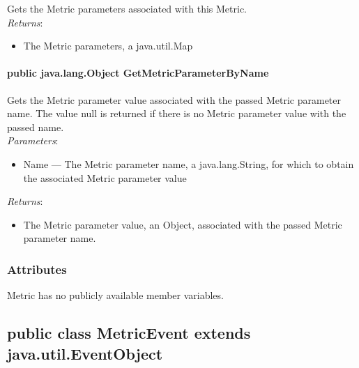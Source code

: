 \documentclass[$Date: 2003/06/26 19:29:31 $]{glabarticle}
\begin{document}
Gets the Metric parameters associated with this Metric. \\

\textit{Returns}:
\begin{itemize}
\item[] The Metric parameters, a java.util.Map
\end{itemize}

\paragraph{public java.lang.Object GetMetricParameterByName}

Gets the Metric parameter value associated with the passed Metric parameter name. The value null is returned 
if there is no Metric parameter value with the passed name. \\

\textit{Parameters}:
\begin{itemize}
\item[] Name --- The Metric parameter name, a java.lang.String, for which to obtain the associated Metric 
parameter value
\end{itemize}

\textit{Returns}:
\begin{itemize}
\item[] The Metric parameter value, an Object, associated with the passed Metric parameter name.
\end{itemize}


\subsubsection{Attributes}

Metric has no publicly available member variables. 


\newpage

\subsection{public class MetricEvent extends java.util.EventObject}

\end{document}
